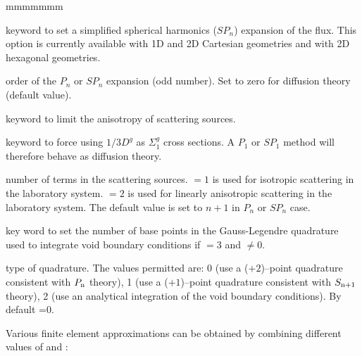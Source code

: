 \begin{ListeDeDescription}{mmmmmmm}
\item[\moc{SPN}] keyword to set a simplified spherical harmonics ($SP_n$) expansion
of the flux.\cite{nse2005,ane10a} This option is currently available with 1D and 2D Cartesian geometries
and with 2D hexagonal geometries.

\item[\dusa{n}] order of the $P_n$ or $SP_n$ expansion (odd number). Set to zero for diffusion theory (default value).

\item[\moc{SCAT}] keyword to limit the anisotropy of scattering sources.

\item[\moc{DIFF}] keyword to force using $1/3D^{g}$ as $\Sigma_1^{g}$ cross sections. A $P_1$ or $SP_1$ method
will therefore behave as diffusion theory.

\item[\dusa{iscat}] number of terms in the scattering sources.  $=1$ is used for
isotropic scattering in the laboratory system.  $=2$ is used for
linearly anisotropic scattering in the laboratory system. The default value is set to $n+1$
in $P_n$ or $SP_n$ case.

\item[\moc{VOID}] key word to set the number of base points in the Gauss-Legendre quadrature used to integrate
void boundary conditions if  $=3$ and  $\ne 0$.

\item[\dusa{nvd}] type of quadrature. The values
permitted are: 0 (use a ($+2$)--point quadrature consistent with $P_{{\rm n}}$ theory),
1 (use a ($+1$)--point quadrature consistent with $S_{{\rm n}+1}$ theory),
2 (use an analytical integration of the void boundary conditions). By default =0.

\end{ListeDeDescription}

Various finite element approximations can be obtained by combining different
values of  and :

